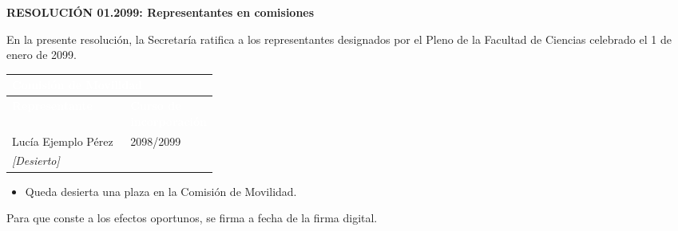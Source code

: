 \documentclass[11pt,a4paper]{article}
\newcommand{\cab}[1]{\cellcolor{azulUZ}\textcolor{white}{\bfseries #1}}
\newcommand{\desierto}{\emph{[Desierto]} & \\\hline}
\newcommand{\organoT}[2]{%
  \par\Needspace{5\baselineskip}\vspace{4pt}\noindent
  {\setlength{\parskip}{0pt}\setlength{\tabcolsep}{4pt}\renewcommand{\arraystretch}{1.05}%
  \begin{tabularx}{\linewidth}{|X|p{0.3\linewidth}|}
  \hline
  \multicolumn{2}{|l|}{\cab{#1}}\\\hline
  \cab{Representante} & \cab{Curso de incorporación}\\\hline
  #2
  \end{tabularx}}\par}
\begin{document}
\begin{center}
{\LARGE\bfseries\color{azulUZ} RESOLUCIÓN 01.2099: Representantes en comisiones}
\end{center}

En la presente resolución, la Secretaría ratifica a los representantes
designados por el Pleno \delorgano{} de la Facultad de Ciencias celebrado el
1 de enero de 2099.


\organoT{Comisión de Movilidad}{%
  Lucía Ejemplo Pérez & 2098/2099\\\hline
  \desierto}

\begin{itemize}
\item Queda desierta una plaza en la Comisión de Movilidad.
\end{itemize}

Para que conste a los efectos oportunos, se firma a fecha de la firma digital.
\firma
\end{document}
